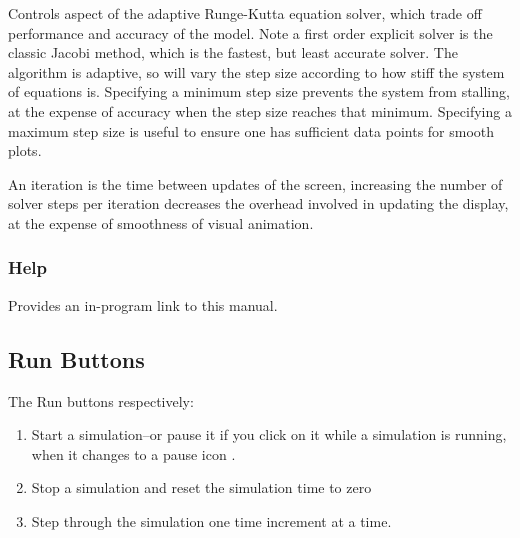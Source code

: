 Controls aspect of the adaptive Runge-Kutta equation solver, which
trade off performance and accuracy of the model. Note a first order
explicit solver is the classic Jacobi method, which is the fastest,
but least accurate solver. The algorithm is adaptive, so will vary the
step size according to how stiff the system of equations
is. Specifying a minimum step size prevents the system from stalling,
at the expense of accuracy when the step size reaches that
minimum. Specifying a maximum step size is useful to ensure one has
sufficient data points for smooth plots.

An iteration is the time between updates of the screen, increasing the
number of solver steps per iteration decreases the overhead involved
in updating the display, at the expense of smoothness of visual
animation.

\subsubsection{Help}
\label{Help}

Provides an in-program link to this manual.

\subsection{Run Buttons}
\label{RunButtons}


The Run buttons respectively:
\begin{enumerate}
\item    Start a simulation--or pause it if you click on it while a
simulation is running, when it changes to a pause icon .
\item Stop a simulation and reset the simulation time to zero
\item Step through the simulation one time increment at a time.
\end{enumerate}


